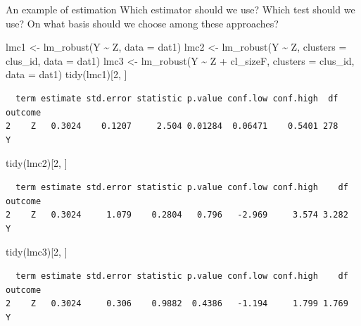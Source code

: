 \documentclass[
  ignorenonframetext,
]{beamer}
\newenvironment{Shaded}{\begin{snugshade}}{\end{snugshade}}
\newcommand{\AttributeTok}[1]{\textcolor[rgb]{0.77,0.63,0.00}{#1}}
\newcommand{\DecValTok}[1]{\textcolor[rgb]{0.00,0.00,0.81}{#1}}
\newcommand{\FunctionTok}[1]{\textcolor[rgb]{0.00,0.00,0.00}{#1}}
\newcommand{\NormalTok}[1]{#1}
\newcommand{\OtherTok}[1]{\textcolor[rgb]{0.56,0.35,0.01}{#1}}
\newcommand{\SpecialCharTok}[1]{\textcolor[rgb]{0.00,0.00,0.00}{#1}}
\begin{document}
\begin{frame}[fragile]{An example of estimation}
\protect\hypertarget{an-example-of-estimation-1}{}
Which estimator should we use? Which test should we use? On what basis
should we choose among these approaches?

\scriptsize

\begin{Shaded}
\begin{Highlighting}[]
\NormalTok{lmc1 }\OtherTok{\textless{}{-}} \FunctionTok{lm\_robust}\NormalTok{(Y }\SpecialCharTok{\textasciitilde{}}\NormalTok{ Z, }\AttributeTok{data =}\NormalTok{ dat1)}
\NormalTok{lmc2 }\OtherTok{\textless{}{-}} \FunctionTok{lm\_robust}\NormalTok{(Y }\SpecialCharTok{\textasciitilde{}}\NormalTok{ Z, }\AttributeTok{clusters =}\NormalTok{ clus\_id, }\AttributeTok{data =}\NormalTok{ dat1)}
\NormalTok{lmc3 }\OtherTok{\textless{}{-}} \FunctionTok{lm\_robust}\NormalTok{(Y }\SpecialCharTok{\textasciitilde{}}\NormalTok{ Z }\SpecialCharTok{+}\NormalTok{ cl\_sizeF, }\AttributeTok{clusters =}\NormalTok{ clus\_id, }\AttributeTok{data =}\NormalTok{ dat1)}
\FunctionTok{tidy}\NormalTok{(lmc1)[}\DecValTok{2}\NormalTok{, ]}
\end{Highlighting}
\end{Shaded}

\begin{verbatim}
  term estimate std.error statistic p.value conf.low conf.high  df outcome
2    Z   0.3024    0.1207     2.504 0.01284  0.06471    0.5401 278       Y
\end{verbatim}

\begin{Shaded}
\begin{Highlighting}[]
\FunctionTok{tidy}\NormalTok{(lmc2)[}\DecValTok{2}\NormalTok{, ]}
\end{Highlighting}
\end{Shaded}

\begin{verbatim}
  term estimate std.error statistic p.value conf.low conf.high    df outcome
2    Z   0.3024     1.079    0.2804   0.796   -2.969     3.574 3.282       Y
\end{verbatim}

\begin{Shaded}
\begin{Highlighting}[]
\FunctionTok{tidy}\NormalTok{(lmc3)[}\DecValTok{2}\NormalTok{, ]}
\end{Highlighting}
\end{Shaded}

\begin{verbatim}
  term estimate std.error statistic p.value conf.low conf.high    df outcome
2    Z   0.3024     0.306    0.9882  0.4386   -1.194     1.799 1.769       Y
\end{verbatim}

\normalsize
\end{frame}
\end{document}
